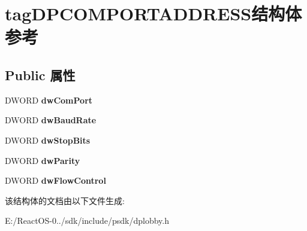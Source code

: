 \hypertarget{structtag_d_p_c_o_m_p_o_r_t_a_d_d_r_e_s_s}{}\section{tag\+D\+P\+C\+O\+M\+P\+O\+R\+T\+A\+D\+D\+R\+E\+S\+S结构体 参考}
\label{structtag_d_p_c_o_m_p_o_r_t_a_d_d_r_e_s_s}
\subsection*{Public 属性}
\begin{DoxyCompactItemize}
\item 
\mbox{\label{structtag_d_p_c_o_m_p_o_r_t_a_d_d_r_e_s_s_a4817b79cb3945a9f343e9e981a7e6ced}} 
D\+W\+O\+RD {\bfseries dw\+Com\+Port}
\item 
\mbox{\label{structtag_d_p_c_o_m_p_o_r_t_a_d_d_r_e_s_s_af77f319318a171dc06c14e8facc95caa}} 
D\+W\+O\+RD {\bfseries dw\+Baud\+Rate}
\item 
\mbox{\label{structtag_d_p_c_o_m_p_o_r_t_a_d_d_r_e_s_s_ad7fcc31c249e71fa670f0344873b80db}} 
D\+W\+O\+RD {\bfseries dw\+Stop\+Bits}
\item 
\mbox{\label{structtag_d_p_c_o_m_p_o_r_t_a_d_d_r_e_s_s_a1b2c950ab1c80d837f695c25b3af751f}} 
D\+W\+O\+RD {\bfseries dw\+Parity}
\item 
\mbox{\label{structtag_d_p_c_o_m_p_o_r_t_a_d_d_r_e_s_s_a87eb85b141198718b7576df459f84e41}} 
D\+W\+O\+RD {\bfseries dw\+Flow\+Control}
\end{DoxyCompactItemize}


该结构体的文档由以下文件生成\+:\begin{DoxyCompactItemize}
\item 
E\+:/\+React\+O\+S-\/0../sdk/include/psdk/dplobby.\+h\end{DoxyCompactItemize}
